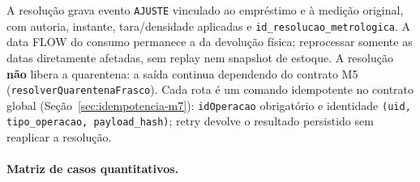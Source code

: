 \begin{regra}
A resolução grava evento \texttt{AJUSTE} vinculado ao empréstimo e à medição original, com autoria, instante, tara/densidade aplicadas e \texttt{id\_resolucao\_metrologica}. A data FLOW do consumo permanece a da devolução física; reprocessar somente as datas diretamente afetadas, sem replay nem snapshot de estoque. A resolução \textbf{não} libera a quarentena: a saída continua dependendo do contrato M5 (\texttt{resolverQuarentenaFrasco}). Cada rota é um comando idempotente no contrato global (Seção~\ref{sec:idempotencia-m7}): \texttt{idOperacao} obrigatório e identidade \texttt{(uid, tipo\_operacao, payload\_hash)}; retry devolve o resultado persistido sem reaplicar a resolução.
\end{regra}

\paragraph{Matriz de casos quantitativos.}
